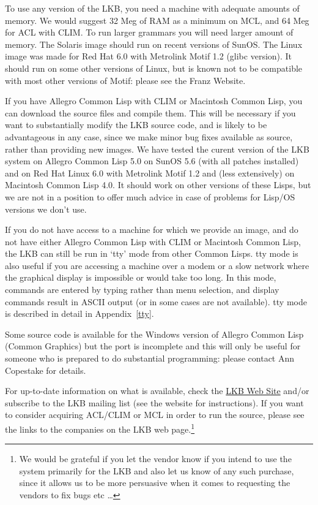 \documentclass[12pt]{report}
\begin{document}
To use any version of the LKB, 
you need a machine with adequate amounts of memory.
We would suggest 32 Meg of RAM as a minimum on MCL, 
and 64 Meg for ACL with CLIM.
To run larger grammars
you will need larger amount of memory.  
The Solaris image should run on recent versions of SunOS.
The Linux image was made for Red Hat 6.0 with Metrolink Motif 1.2
(glibc version).  It should run on some other versions of Linux, but
is known not to be compatible with most other versions of Motif: 
please see the Franz Website.

If you have Allegro Common Lisp with CLIM or Macintosh Common Lisp, you 
can download the source files
and compile them.  This will be necessary
if you want to substantially
modify the LKB source code, and is likely to be
advantageous in any case, since we make minor bug fixes available
as source, rather than providing new images.
We have tested the curent version of the LKB
system on Allegro Common Lisp 5.0 on SunOS 5.6 
(with all patches installed)
and on Red Hat Linux 6.0 with Metrolink Motif 1.2
and (less extensively) on 
Macintosh Common Lisp 4.0.
It should work on other versions of these Lisps, but we are not in a position
to offer much advice in case of problems for Lisp/OS versions
we don't use.

If you do not have access to a machine for which we provide an image,
and do not have either Allegro Common Lisp with CLIM or Macintosh Common
Lisp, the LKB can still be run in `tty' mode from other Common Lisps.
tty mode is also useful if you are accessing a machine over a 
modem or a slow network
where the graphical display is impossible or would take too long.
In this mode, commands are entered by typing rather than menu selection,
and display commands result in ASCII output (or in some cases are
not available).
tty mode is described in detail in Appendix~\ref{tty}.

Some source code is available for 
the Windows version of Allegro Common Lisp (Common Graphics) but the port 
is incomplete and this will only be useful for someone who is prepared
to do substantial programming: please contact Ann Copestake for details.

For up-to-date information on what is available, check the 
\href{http://www-csli.stanford.edu/~aac/lkb.html}{LKB Web Site}
and/or subscribe to the LKB mailing list (see the website for instructions).
If you want to consider acquiring ACL/CLIM or MCL in order to run the source,
please see the links to the companies on the LKB web page.\footnote{We 
would be grateful if you let the vendor know if you intend to use the
system primarily for the LKB
and also let us know of any such purchase, since it allows us to
be more persuasive when it comes to requesting the vendors 
to fix bugs etc \ldots}
\end{document}
